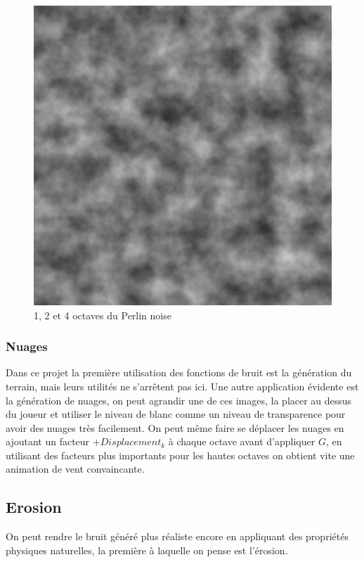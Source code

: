 \documentclass[11pt]{article} %
\begin{document}
\begin{figure}[h]
	\includegraphics[scale=.3]{perlin_4_octaves}
	\caption{1, 2 et 4 octaves du Perlin noise}
	\label{fig:layered_noise}
\end{figure}

\subsubsection{Nuages}
Dans ce projet la première utilisation des fonctions de bruit est la génération du terrain, mais leurs utilités ne s'arrêtent pas ici. Une autre application évidente est la génération de nuages, on peut agrandir une de ces images, la placer au dessus du joueur et utiliser le niveau de blanc comme un niveau de transparence pour avoir des nuages très facilement. On peut même faire se déplacer les nuages en ajoutant un facteur $+Displacement_{k}$ à chaque octave avant d'appliquer $G$, en utilisant des facteurs plus importants pour les hautes octaves on obtient vite une animation de vent convaincante.

\subsection{Erosion}

On peut rendre le bruit généré plus réaliste encore en appliquant des propriétés physiques naturelles, la première à laquelle on pense est l'érosion.
\end{document}
